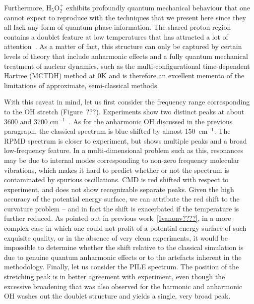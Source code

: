 \documentclass[aps,prb,superscriptaddress,amsmath,amssymb,showpacs,twocolumn]{revtex4}
\begin{document}
Furthermore, H$_5$O$_2^+$ exhibits profoundly quantum mechanical behaviour
that one cannot expect to reproduce with the techniques that we present here
since they all lack any form of quantum phase information. 
The shared proton region contains a doublet feature 
at low temperatures that has attracted a lot of attention~\cite{GuascoJohnson2011, HammerBowmanCarter2005}.
As a matter of fact, this structure can only be captured by certain levels of 
theory that include anharmonic effects and a fully quantum mechanical treatment
of nuclear dynamics, such as the multi-configurational time-dependent Hartree (MCTDH) method at
0K \cite{VendrellMeyer2007} and is therefore an excellent memento of the limitations of 
approximate, semi-classical methods.

With this caveat in mind, let us first consider the frequency range corresponding 
to the OH stretch (Figure~???). Experiments show two distinct peaks at about 
3600 and 3700 cm$^{-1}$~\cite{YehLee1989}. As for the anharmonic OH discussed 
in the previous paragraph, the classical spectrum is blue shifted by almost 
150~cm$^{-1}$. The RPMD spectrum is closer to experiment, but shows multiple peaks and a broad
low-frequency feature. In a multi-dimensional problem such as this, resonances may be due to 
internal modes corresponding to non-zero frequency molecular vibrations, which makes it hard
to predict whether or not the spectrum is contaminated by spurious oscillations. 
CMD is red shifted with respect to experiment, and does not show recognizable separate peaks.
Given the high accuracy of the potential energy surface, we can attribute the red shift to the
curvature problem -- and in fact the shift is exacerbated if the temperature is further reduced. 
As pointed out in previous work~\ref{Ivanonv????}, in a more complex case in which one could not
profit of a potential energy surface of such exquisite quality, or in the absence of very clean 
experiments, it would be impossible to determine whether the shift relative to the classical
simulation is due to genuine quantum anharmonic effects or to the artefacts inherent in the methodology.
Finally, let us consider the PILE spectrum. The position of the stretching peak  is in better agreement
with experiment, even though the excessive broadening that was also observed for the harmonic and anharmonic
OH washes out the doublet structure and yields a single, very broad peak.
\end{document}
